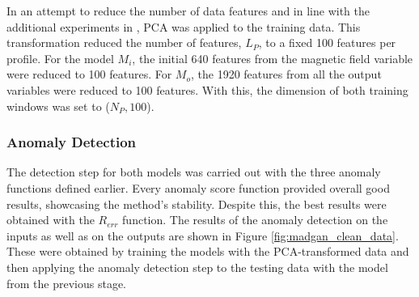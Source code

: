 In an attempt to reduce the number of data features and in line with the additional experiments in \cite{li.etal_MADGANMultivariateAnomaly_2019}, PCA was applied to the training data. This transformation reduced the number of features, $L_P$, to a fixed 100 features per profile. For the model $M_i$, the initial 640 features from the magnetic field variable were reduced to 100 features. For $M_o$, the 1920 features from all the output variables were reduced to 100 features. With this, the dimension of both training windows was set to ($N_P, 100$).

\subsubsection*{Anomaly Detection}
The detection step for both models was carried out with the three anomaly functions defined earlier. Every anomaly score function provided overall good results, showcasing the method's stability. Despite this, the best results were obtained with the $R_{err}$ function. The results of the anomaly detection on the inputs as well as on the outputs are shown in Figure \ref{fig:madgan_clean_data}. These were obtained by training the models with the PCA-transformed data and then applying the anomaly detection step to the testing data with the model from the previous stage.

